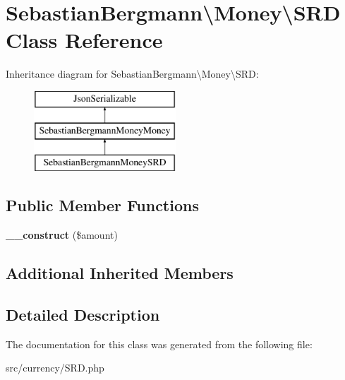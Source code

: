 \hypertarget{classSebastianBergmann_1_1Money_1_1SRD}{}\section{Sebastian\+Bergmann\textbackslash{}Money\textbackslash{}S\+R\+D Class Reference}
\label{classSebastianBergmann_1_1Money_1_1SRD}
Inheritance diagram for Sebastian\+Bergmann\textbackslash{}Money\textbackslash{}S\+R\+D\+:\begin{figure}[H]
\begin{center}
\leavevmode
\includegraphics[height=3.000000cm]{classSebastianBergmann_1_1Money_1_1SRD}
\end{center}
\end{figure}
\subsection*{Public Member Functions}
\begin{DoxyCompactItemize}
\item 
\hypertarget{classSebastianBergmann_1_1Money_1_1SRD_ac4dac671d74bbb06bc0a74e6caf5c785}{}{\bfseries \+\_\+\+\_\+construct} (\$amount)\label{classSebastianBergmann_1_1Money_1_1SRD_ac4dac671d74bbb06bc0a74e6caf5c785}

\end{DoxyCompactItemize}
\subsection*{Additional Inherited Members}


\subsection{Detailed Description}


The documentation for this class was generated from the following file\+:\begin{DoxyCompactItemize}
\item 
src/currency/S\+R\+D.\+php\end{DoxyCompactItemize}

